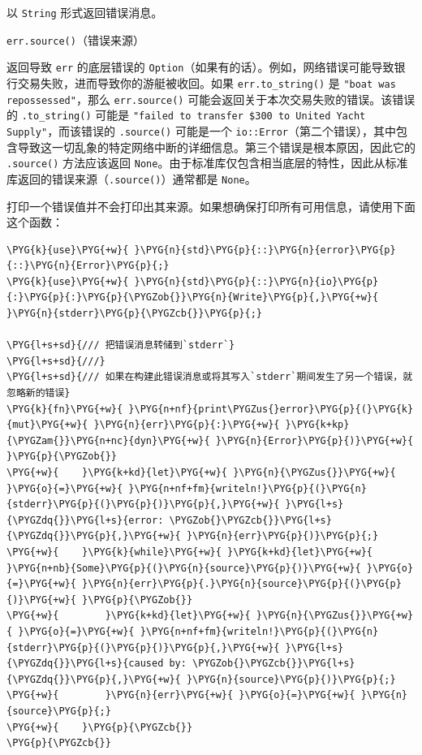 以 \texttt{String} 形式返回错误消息。

\begin{mySidenote}
\texttt{err.source()}（错误来源）
\end{mySidenote}

返回导致 \texttt{err} 的底层错误的 \texttt{Option}（如果有的话）。例如，网络错误可能导致银行交易失败，进而导致你的游艇被收回。如果 \texttt{err.to\_string()} 是 \texttt{"boat was repossessed"}，那么 \texttt{err.source()} 可能会返回关于本次交易失败的错误。该错误的 \texttt{.to\_string()} 可能是 \texttt{"failed to transfer \$300 to United Yacht Supply"}，而该错误的 \texttt{.source()} 可能是一个 \texttt{io::Error}（第二个错误），其中包含导致这一切乱象的特定网络中断的详细信息。第三个错误是根本原因，因此它的 \texttt{.source()} 方法应该返回 \texttt{None}。由于标准库仅包含相当底层的特性，因此从标准库返回的错误来源（\texttt{.source()}）通常都是 \texttt{None}。

打印一个错误值并不会打印出其来源。如果想确保打印所有可用信息，请使用下面这个函数：

\begin{Verbatim}[commandchars=\\\{\},breaklines=true,breakanywhere=true,fontsize=\codefont,xleftmargin=17bp]
\PYG{k}{use}\PYG{+w}{ }\PYG{n}{std}\PYG{p}{::}\PYG{n}{error}\PYG{p}{::}\PYG{n}{Error}\PYG{p}{;}
\PYG{k}{use}\PYG{+w}{ }\PYG{n}{std}\PYG{p}{::}\PYG{n}{io}\PYG{p}{:}\PYG{p}{:}\PYG{p}{\PYGZob{}}\PYG{n}{Write}\PYG{p}{,}\PYG{+w}{ }\PYG{n}{stderr}\PYG{p}{\PYGZcb{}}\PYG{p}{;}

\PYG{l+s+sd}{/// 把错误消息转储到`stderr`}
\PYG{l+s+sd}{///}
\PYG{l+s+sd}{/// 如果在构建此错误消息或将其写入`stderr`期间发生了另一个错误，就忽略新的错误}
\PYG{k}{fn}\PYG{+w}{ }\PYG{n+nf}{print\PYGZus{}error}\PYG{p}{(}\PYG{k}{mut}\PYG{+w}{ }\PYG{n}{err}\PYG{p}{:}\PYG{+w}{ }\PYG{k+kp}{\PYGZam{}}\PYG{n+nc}{dyn}\PYG{+w}{ }\PYG{n}{Error}\PYG{p}{)}\PYG{+w}{ }\PYG{p}{\PYGZob{}}
\PYG{+w}{    }\PYG{k+kd}{let}\PYG{+w}{ }\PYG{n}{\PYGZus{}}\PYG{+w}{ }\PYG{o}{=}\PYG{+w}{ }\PYG{n+nf+fm}{writeln!}\PYG{p}{(}\PYG{n}{stderr}\PYG{p}{(}\PYG{p}{)}\PYG{p}{,}\PYG{+w}{ }\PYG{l+s}{\PYGZdq{}}\PYG{l+s}{error: \PYGZob{}\PYGZcb{}}\PYG{l+s}{\PYGZdq{}}\PYG{p}{,}\PYG{+w}{ }\PYG{n}{err}\PYG{p}{)}\PYG{p}{;}
\PYG{+w}{    }\PYG{k}{while}\PYG{+w}{ }\PYG{k+kd}{let}\PYG{+w}{ }\PYG{n+nb}{Some}\PYG{p}{(}\PYG{n}{source}\PYG{p}{)}\PYG{+w}{ }\PYG{o}{=}\PYG{+w}{ }\PYG{n}{err}\PYG{p}{.}\PYG{n}{source}\PYG{p}{(}\PYG{p}{)}\PYG{+w}{ }\PYG{p}{\PYGZob{}}
\PYG{+w}{        }\PYG{k+kd}{let}\PYG{+w}{ }\PYG{n}{\PYGZus{}}\PYG{+w}{ }\PYG{o}{=}\PYG{+w}{ }\PYG{n+nf+fm}{writeln!}\PYG{p}{(}\PYG{n}{stderr}\PYG{p}{(}\PYG{p}{)}\PYG{p}{,}\PYG{+w}{ }\PYG{l+s}{\PYGZdq{}}\PYG{l+s}{caused by: \PYGZob{}\PYGZcb{}}\PYG{l+s}{\PYGZdq{}}\PYG{p}{,}\PYG{+w}{ }\PYG{n}{source}\PYG{p}{)}\PYG{p}{;}
\PYG{+w}{        }\PYG{n}{err}\PYG{+w}{ }\PYG{o}{=}\PYG{+w}{ }\PYG{n}{source}\PYG{p}{;}
\PYG{+w}{    }\PYG{p}{\PYGZcb{}}
\PYG{p}{\PYGZcb{}}
\end{Verbatim}

